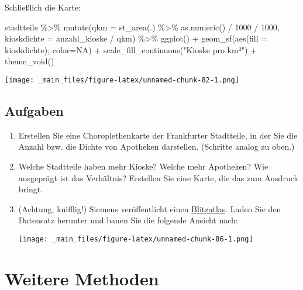 \documentclass[11pt,german,a4paper]{article}
\newenvironment{Shaded}{\begin{snugshade}}{\end{snugshade}}
\newcommand{\AttributeTok}[1]{\textcolor[rgb]{0.77,0.63,0.00}{#1}}
\newcommand{\ConstantTok}[1]{\textcolor[rgb]{0.00,0.00,0.00}{#1}}
\newcommand{\DecValTok}[1]{\textcolor[rgb]{0.00,0.00,0.81}{#1}}
\newcommand{\FunctionTok}[1]{\textcolor[rgb]{0.00,0.00,0.00}{#1}}
\newcommand{\NormalTok}[1]{#1}
\newcommand{\SpecialCharTok}[1]{\textcolor[rgb]{0.00,0.00,0.00}{#1}}
\newcommand{\StringTok}[1]{\textcolor[rgb]{0.31,0.60,0.02}{#1}}
\begin{document}
Schließlich die Karte:

\begin{Shaded}
\begin{Highlighting}[]
\NormalTok{stadtteile }\SpecialCharTok{\%\textgreater{}\%}
  \FunctionTok{mutate}\NormalTok{(}\AttributeTok{qkm =} \FunctionTok{st\_area}\NormalTok{(.) }\SpecialCharTok{\%\textgreater{}\%} \FunctionTok{as.numeric}\NormalTok{() }\SpecialCharTok{/} \DecValTok{1000} \SpecialCharTok{/} \DecValTok{1000}\NormalTok{,}
         \AttributeTok{kioskdichte =}\NormalTok{ anzahl\_kioske }\SpecialCharTok{/}\NormalTok{ qkm) }\SpecialCharTok{\%\textgreater{}\%}
  \FunctionTok{ggplot}\NormalTok{() }\SpecialCharTok{+}
    \FunctionTok{geom\_sf}\NormalTok{(}\FunctionTok{aes}\NormalTok{(}\AttributeTok{fill =}\NormalTok{ kioskdichte), }\AttributeTok{color=}\ConstantTok{NA}\NormalTok{) }\SpecialCharTok{+}
    \FunctionTok{scale\_fill\_continuous}\NormalTok{(}\StringTok{"Kioske pro km²"}\NormalTok{) }\SpecialCharTok{+}
    \FunctionTok{theme\_void}\NormalTok{()}
\end{Highlighting}
\end{Shaded}

\texttt{[image: \_main\_files/figure-latex/unnamed-chunk-82-1.png]}

\hypertarget{aufgaben-3}{%
\subsection{Aufgaben}\label{aufgaben-3}}

\begin{enumerate}
\def\labelenumi{\arabic{enumi}.}
\item
  Erstellen Sie eine Choroplethenkarte der Frankfurter Stadtteile, in der Sie die Anzahl bzw. die Dichte von Apotheken darstellen. (Schritte analog zu oben.)
\item
  Welche Stadtteile haben mehr Kioske? Welche mehr Apotheken? Wie ausgeprägt ist das Verhältnis? Erstellen Sie eine Karte, die das zum Ausdruck bringt.
\item
  (Achtung, knifflig!) Siemens veröffentlicht einen \href{https://press.siemens.com/global/de/feature/wo-blitzt-es-am-haeufigsten}{Blitzatlas}. Laden Sie den Datensatz herunter und bauen Sie die folgende Ansicht nach:

  \texttt{[image: \_main\_files/figure-latex/unnamed-chunk-86-1.png]}
\end{enumerate}

\hypertarget{weitere-methoden}{%
\section{Weitere Methoden}\label{weitere-methoden}}
\end{document}
